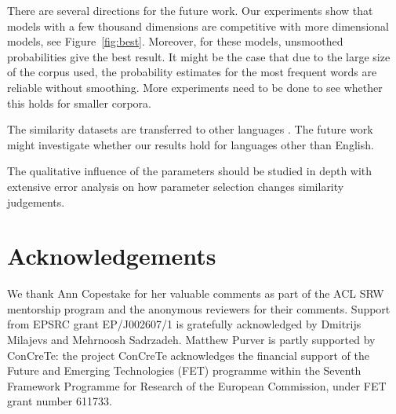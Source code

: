 \documentclass[11pt]{article}
\begin{document}
There are several directions for the future work. Our experiments show that models with a few thousand dimensions are competitive with more dimensional models, see Figure~\ref{fig:best}. Moreover, for these models, unsmoothed probabilities give the best result. It might be the case that due to the large size of the corpus used, the probability estimates for the most frequent words are reliable without smoothing. More experiments need to be done to see whether this holds for smaller corpora.

The similarity datasets are transferred to other languages \cite{DBLP:journals/corr/LeviantR15}. The future work might investigate whether our results hold for languages other than English.

The qualitative influence of the parameters should be studied in depth with extensive error analysis on how parameter selection changes similarity judgements.

\section*{Acknowledgements}

We thank Ann Copestake for her valuable comments as part of the ACL SRW mentorship program and the anonymous reviewers for their comments. Support from EPSRC grant EP/J002607/1 is gratefully acknowledged by Dmitrijs Milajevs and Mehrnoosh Sadrzadeh.
Matthew Purver is partly supported by ConCreTe: the project ConCreTe acknowledges the financial support of the Future and Emerging Technologies (FET) programme within the Seventh Framework Programme for Research of the European Commission, under FET grant number 611733.


\balance

\end{document}
